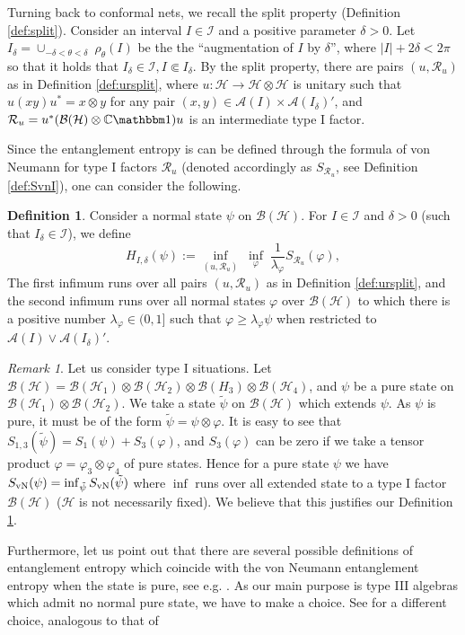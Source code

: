 \documentclass[a4paper,12pt]{article}
\theoremstyle{plain}
\theoremstyle{definition}
\newtheorem{defi}[theo]{Definition}
\theoremstyle{remark}
\newtheorem{remark}[theo]{Remark}
\newcommand{\Svn}{S_{\rm vN}}
\def\CC{{\mathbb C}}
\def\A{{\mathcal A}}
\def\B{{\mathcal B}}
\def\H{{\mathcal H}}
\def\R{{\mathcal R}}
\def\R{{\mathcal R}}
\def\1{{\mathbbm 1}}
\begin{document}

Turning back to conformal nets, we recall the split property (Definition \ref{def:split}).
Consider an interval $I\in \mathcal{I}$ and a positive parameter $\delta>0$.
Let $I_\delta = \cup_{-\delta < \theta <\delta}\;\rho_\theta(I)$
be the the ``augmentation of $I$ by $\delta$'', where $|I| + 2\delta < 2\pi$
so that it holds that $I_\delta \in \mathcal{I}, I \Subset I_\delta$.
By the split property, there are pairs $(u,\R_u)$ as in Definition \ref{def:ursplit},
where $u:\H\to\H\otimes\H$ is unitary such that $u(xy)u^* = x\otimes y$ for any pair $(x,y) \in \A(I) \times \A(I_\delta)'$,
and $\R_u = u^*(\B(\H)\otimes \CC\1)u$ is an intermediate type I factor.

Since the entanglement entropy is can be defined through the formula of von Neumann for type I factors $\R_u$
(denoted accordingly as $S_{\R_u}$, see Definition \ref{def:SvnI}),
one can consider the following.

\begin{defi}\label{def:cut1} Consider a normal state $\psi$ on $\B(\H)$.
For $I\in\mathcal{I}$ and $\delta>0$ (such that $I_\delta\in\mathcal{I}$), we define
  \[ H_{I,\delta}(\psi) := \inf_{(u,\R_u)}\;\inf_{\varphi} \; \frac{1}{\lambda_\varphi}S_{\R_u}(\varphi), \]
 The first infimum runs over all pairs $(u,\R_u)$ as in Definition \ref{def:ursplit},
 and the second infimum runs over all normal states $\varphi$ over $\B(\H)$ to which there is a positive number $\lambda_\varphi\in(0,1]$ such that $\varphi  \ge \lambda_\varphi \psi$ when restricted to $\A(I)\vee\A(I_\delta)'$.
\end{defi}

\begin{remark}
 Let us consider type I situations. Let $\B(\H) = \B(\H_1)\otimes \B(\H_2)\otimes \B(H_3)\otimes \B(\H_4)$,
 and $\psi$ be a pure state on $\B(\H_1)\otimes \B(\H_2)$.
 We take a state $\tilde \psi$ on $\B(\H)$ which extends $\psi$. As $\psi$ is pure,
 it must be of the form $\tilde \psi = \psi \otimes \varphi$.
 It is easy to see that $S_{1,3}(\tilde\psi) = S_1(\psi) + S_3(\varphi)$,
 and $S_3(\varphi)$ can be zero if we take a tensor product $\varphi = \varphi_3\otimes \varphi_4$ of pure states.
 Hence for a pure state $\psi$ we have $\Svn(\psi) = \inf_{\tilde\psi} \Svn(\tilde \psi)$
 where $\inf$ runs over all extended state to a type I factor $\B(\H)$ ($\H$ is not necessarily fixed).
 We believe that this justifies our Definition \ref{def:cut1}.
 
 Furthermore, let us point out that there are several possible definitions of entanglement entropy
 which coincide with the von Neumann entanglement entropy when the state is pure, see e.g.\! \cite[Theorem 3]{VP98}.
 As our main purpose is type III algebras which admit no normal pure state, we have to make a choice.
 See \cite{HS17} for a different choice, analogous to that of \cite[Section D.1]{VP98}
\end{remark}
\end{document}
